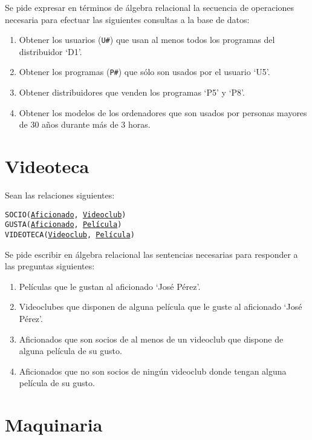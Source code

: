 \documentclass{db-practice}
\begin{document}
Se pide expresar en términos de álgebra relacional la secuencia de operaciones necesaria para efectuar las siguientes consultas a la base de datos:

\begin{enumerate}
    \item Obtener los usuarios (\texttt{U\#}) que usan al menos todos los programas del distribuidor `D1'.
    \item Obtener los programas (\texttt{P\#}) que sólo son usados por el usuario `U5'.
    \item Obtener distribuidores que venden los programas `P5' y `P8'.
    \item Obtener los modelos de los ordenadores que son usados por personas mayores de 30 años durante más de 3 horas.
\end{enumerate}

\section{Videoteca}

Sean las relaciones siguientes:

\begin{addmargin}[1.5em]{0em}
    \texttt{SOCIO(\underline{Aficionado}, \underline{Videoclub})}\\
    \texttt{GUSTA(\underline{Aficionado}, \underline{Película})}\\
    \texttt{VIDEOTECA(\underline{Videoclub}, \underline{Película})}
\end{addmargin}

Se pide escribir en álgebra relacional las sentencias necesarias para responder a las preguntas siguientes:

\begin{enumerate}
    \item Películas que le gustan al aficionado `José Pérez'.
    \item Videoclubes que disponen de alguna película que le guste al aficionado `José Pérez'.
    \item Aficionados que son socios de al menos de un videoclub que dispone de alguna película de su gusto.
    \item Aficionados que no son socios de ningún videoclub donde tengan alguna película de su gusto.
\end{enumerate}

\section{Maquinaria}
\end{document}
